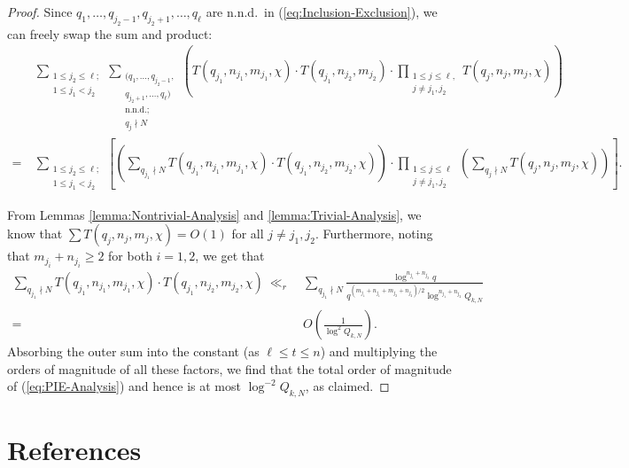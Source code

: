 \documentclass[12pt, reqno,oneside]{amsart}
\theoremstyle{plain}
\theoremstyle{definition}
\theoremstyle{remark}
\theoremstyle{plain}
\numberwithin{equation}{section}
\begin{document}
\begin{proof}
Since $q_1,\dots,q_{j_2-1},q_{j_2+1},\dots,q_\ell$ are n.n.d.\ in (\ref{eq:Inclusion-Exclusion}), we can freely swap the sum and product:
\begin{align}
& \sum_{\substack{1\leq j_2\leq \ell;\\1\leq j_1<j_2}}\sum_{\substack{(q_1,\dots,q_{j_2-1},\\ q_{j_2+1},\dots,q_\ell) \\ \text{n.n.d.}; \\ q_j\nmid N}}\left(T(q_{j_1},n_{j_1},m_{j_1},\chi)\cdot T(q_{j_1},n_{j_2},m_{j_2})\cdot\prod_{\substack{1\leq j\leq\ell, \\ j\neq j_1, j_2}} T(q_j,n_j,m_j,\chi)\right) \\
\label{eq:PIE-Analysis}
= \ & \sum_{\substack{1\leq j_2\leq \ell;\\1\leq j_1<j_2}}\left[\left(\sum_{q_{j_1}\nmid N}T(q_{j_1},n_{j_1},m_{j_1},\chi)\cdot T(q_{j_1},n_{j_2},m_{j_2},\chi)\right)\cdot\prod_{\substack{1\leq j\leq\ell \\ j\neq j_1,j_2}}\left(\sum_{q_j\nmid N}T(q_j,n_j,m_j,\chi)\right)\right].
\end{align}

From Lemmas \ref{lemma:Nontrivial-Analysis} and \ref{lemma:Trivial-Analysis}, we know that $\sum T(q_j,n_j,m_j,\chi)=O(1)$ for all $j\neq j_1,j_2$. Furthermore, noting that $m_{j_i}+n_{j_i}\geq2$ for both $i=1,2$, we get that
\begin{align}
\nonumber\sum_{q_{j_1}\nmid N}T(q_{j_1},n_{j_1},m_{j_1},\chi)\cdot T(q_{j_1},n_{j_2},m_{j_2},\chi) \ \ll_r & \ \sum_{q_{j_1}\nmid N}\frac{\log^{n_{j_1}+n_{j_2}} q}{q^{(m_{j_1}+n_{j_1}+m_{j_2}+n_{j_2})/2}\log^{n_{j_1}+n_{j_2}} Q_{k,N}}\\
= & \ O\left(\frac{1}{\log^2 Q_{k,N}}\right).
\end{align}
Absorbing the outer sum into the constant (as $\ell\leq t\leq n$) and multiplying the orders of magnitude of all these factors, we find that the total order of magnitude of (\ref{eq:PIE-Analysis}) and hence is at most $\log^{-2}Q_{k,N}$, as claimed. 
\end{proof}

\section*{References}

\printbibliography[heading=none]
\end{document}
